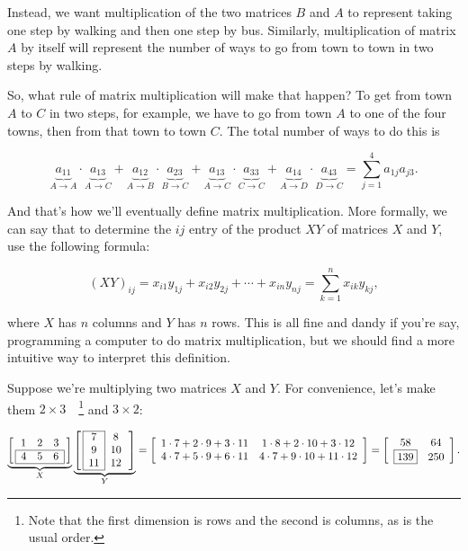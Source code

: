 \documentclass[../gatm.tex]{subfiles}
\begin{document}
Instead, we want multiplication of the two matrices $B$ and $A$ to represent taking one step by walking and then one step by bus. Similarly, multiplication of matrix $A$ by itself will represent the number of ways to go from town to town in two steps by walking.

So, what rule of matrix multiplication will make that happen? To get from town $A$ to $C$ in two steps, for example, we have to go from town $A$ to one of the four towns, then from that town to town $C$. The total number of ways to do this is

$$\underbrace{a_{11}}_{A\to A}\cdot \underbrace{a_{13}}_{A\to C}+\underbrace{a_{12}}_{A\to B}\cdot \underbrace{a_{23}}_{B\to C}+\underbrace{a_{13}}_{A\to C}\cdot \underbrace{a_{33}}_{C\to C}+\underbrace{a_{14}}_{A\to D}\cdot \underbrace{a_{43}}_{D\to C}=\sum_{j=1}^{4}a_{1j}a_{j3}.$$

And that's how we'll eventually define matrix multiplication. More formally, we can say that to determine the $ij$ entry of the product $XY$ of matrices $X$ and $Y$, use the following formula:

$$(XY)_{ij}=x_{i1}y_{1j}+x_{i2}y_{2j}+\cdots + x_{in}y_{nj} = \sum_{k=1}^n x_{ik} y_{kj},$$

where $X$ has $n$ columns and $Y$ has $n$ rows. This is all fine and dandy if you're say, programming a computer to do matrix multiplication, but we should find a more intuitive way to interpret this definition.

Suppose we're multiplying two matrices $X$ and $Y$. For convenience, let's make them $2\times 3\quad$\footnote{Note that the first dimension is rows and the second is columns, as is the usual order.} and $3\times 2$:

\begin{center}
$$\underbrace{\left[\,\begin{array}{ccc}
1                      & 2 & 3                      \\ \hline
\multicolumn{1}{|l}{4} & 5 & \multicolumn{1}{l|}{6} \\ \hline
\end{array}\,\right]}_{X}\underbrace{\left[\,\begin{array}{|c|c}
\cline{1-1}
7  & 8  \\
9  & 10 \\
11 & 12 \\ \cline{1-1}
\end{array}\,\right]}_{Y}=\left[\begin{array}{cc}
1\cdot 7 + 2\cdot 9 + 3\cdot 11 & 1\cdot 8 + 2\cdot 10 + 3\cdot 12 \\
4\cdot 7 + 5\cdot 9 + 6\cdot 11 & 4\cdot 7 + 9\cdot 10 + 11\cdot 12 \\
\end{array}
\right]=\left[\begin{array}{cc}
58 & 64 \\
\boxed{139} & 250 \\
\end{array}\right].$$
\end{center}
\end{document}
